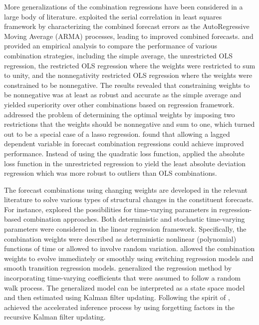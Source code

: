 \documentclass[11pt]{article}
\begin{document}
More generalizations of the combination regressions have been considered in a large body of literature. \cite{Diebold1988-sx} exploited the serial correlation in least squares framework by characterizing the combined forecast errors as the AutoRegressive Moving Average (ARMA) processes, leading to improved combined forecasts. \cite{Gunter1992-go} and \cite{Aksu1992-lb} provided an empirical analysis to compare the performance of various combination strategies, including the simple average, the unrestricted OLS regression, the restricted OLS regression where the weights were restricted to sum to unity, and the nonnegativity restricted OLS regression where the weights were constrained to be nonnegative. The results revealed that constraining weights to be nonnegative was at least as robust and accurate as the simple average and yielded superiority over other combinations based on regression framework. \cite{Conflitti2015-fq} addressed the problem of determining the optimal weights by imposing two restrictions that the weights should be nonnegative and sum to one, which turned out to be a special case of a lasso regression. \cite{Edward_Coulson1993-db} found that allowing a lagged dependent variable in forecast combination regressions could achieve improved performance. Instead of using the quadratic loss function, \cite{Nowotarski2014-ev} applied the absolute loss function in the unrestricted regression to yield the least absolute deviation regression which was more robust to outliers than OLS combinations.

The forecast combinations using changing weights are developed in the relevant literature to solve various types of structural changes in the constituent forecasts. For instance, \cite{Diebold1987-go} explored the possibilities for time-varying parameters in regression-based combination approaches. Both deterministic and stochastic time-varying parameters were considered in the linear regression framework. Specifically, the combination weights were described as deterministic nonlinear (polynomial) functions of time or allowed to involve random variation. \cite{Deutsch1994-ob} allowed the combination weights to evolve immediately or smoothly using switching regression models and smooth transition regression models. \cite{Terui2002-df} generalized the regression method by incorporating time-varying coefficients that were assumed to follow a random walk process. The generalized model can be interpreted as a state space model and then estimated using Kalman filter updating. Following the spirit of \cite{Terui2002-df}, \cite{Raftery2010-qe} achieved the accelerated inference process by using forgetting factors in the recursive Kalman filter updating.
\end{document}

